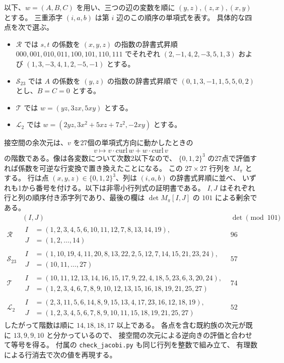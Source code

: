 以下、$w=(A,B,C)$ を用い、三つの辺の変数を順に $(y,z),(z,x),(x,y)$ とする。
三重添字 $(i,a,b)$ は第 $i$ 辺のこの順序の単項式を表す。
具体的な四点を次で選ぶ。
\begin{itemize}
\item $\mathcal R$ では $s,t$ の係数を $(x,y,z)$ の指数の辞書式昇順
$000,001,010,011,100,101,110,111$ でそれぞれ
$(2,-1,4,2,-3,5,1,3)$ および $(1,3,-3,4,1,2,-5,-1)$ とする。
\item $\mathcal S_{23}$ では $A$ の係数を $(y,z)$ の指数の辞書式昇順で
$(0,1,3,-1,1,5,5,0,2)$ とし、$B=C=0$ とする。
\item $\mathcal T$ では $w=(yz,3zx,5xy)$ とする。
\item $\mathcal L_2$ では $w=(2yz,3x^2+5xz+7z^2,-2xy)$ とする。
\end{itemize}
接空間の余次元は、$v$ を27個の単項式方向に動かしたときの
\[
 v\longmapsto v\cdot\mathrm{curl}\,w+w\cdot\mathrm{curl}\,v
\]
の階数である。像は各変数について次数2以下なので、
$\{0,1,2\}^3$ の27点で評価すれば係数を可逆な行変換で置き換えたことになる。
この $27\times27$ 行列を $M_\pi$ とする。
行は点 $(x,y,z)\in\{0,1,2\}^3$、列は $(i,a,b)$ の辞書式昇順に並べ、
いずれも1から番号を付ける。以下は非零小行列式の証明書である。
$I,J$ はそれぞれ行と列の順序付き添字列であり、最後の欄は
$\det M_\pi[I,J]$ の $101$ による剰余である。
\[
\begin{array}{c|l|r}
 & (I,J)&\det\pmod {101}\\\hline
\mathcal R&
\begin{aligned}
 I&=(1,2,3,4,5,6,10,11,12,7,8,13,14,19),\\
 J&=(1,2,\ldots,14)
\end{aligned}&96\\[4pt]
\mathcal S_{23}&
\begin{aligned}
 I&=(1,10,19,4,11,20,8,13,22,2,5,12,7,14,15,21,23,24),\\
 J&=(10,11,\ldots,27)
\end{aligned}&57\\[4pt]
\mathcal T&
\begin{aligned}
 I&=(10,11,12,13,14,16,15,17,9,22,4,18,5,23,6,3,20,24),\\
 J&=(1,2,3,4,6,7,8,9,10,12,13,15,16,18,19,21,25,27)
\end{aligned}&74\\[4pt]
\mathcal L_2&
\begin{aligned}
 I&=(2,3,11,5,6,14,8,9,15,13,4,17,23,16,12,18,19),\\
 J&=(1,2,3,4,5,6,7,8,9,10,11,15,18,19,21,25,27)
\end{aligned}&52
\end{array}
\]
したがって階数は順に $14,18,18,17$ 以上である。
各点を含む既約族の次元が既に $13,9,9,10$ と分かっているので、
接空間の次元による逆向きの評価と合わせて等号を得る。
付属の \texttt{check\_jacobi.py} も同じ行列を整数で組み立て、
有理数による行消去で次の値を再現する。

